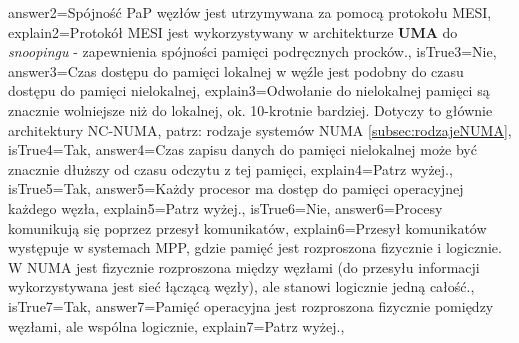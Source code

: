 \begin{enumerate}
\begin{minipage}{\textwidth}
{		answer2={Spójność PaP węzłów jest utrzymywana za pomocą protokołu MESI},%
		explain2={Protokół MESI jest wykorzystywany w architekturze \textbf{UMA} do \emph{snoopingu} - zapewnienia spójności pamięci podręcznych procków.},%
		isTrue3={Nie},%
		answer3={Czas dostępu do pamięci lokalnej w węźle jest podobny do czasu dostępu do pamięci nielokalnej},%
		explain3={Odwołanie do nielokalnej pamięci są znacznie wolniejsze niż do lokalnej, ok. 10-krotnie bardziej. Dotyczy to głównie architektury NC-NUMA, patrz: rodzaje systemów NUMA \ref{subsec:rodzajeNUMA}},%
		isTrue4={Tak},%
		answer4={Czas zapisu danych do pamięci nielokalnej może być znacznie dłuższy od czasu odczytu z tej pamięci},%
		explain4={Patrz wyżej.},%
		isTrue5={Tak},%
		answer5={Każdy procesor ma dostęp do pamięci operacyjnej każdego węzła}, %
		explain5={Patrz wyżej.}, %
		isTrue6={Nie}, %
		answer6={Procesy komunikują się poprzez przesył komunikatów}, %
		explain6={Przesył komunikatów występuje w systemach MPP, gdzie pamięć jest rozproszona fizycznie i logicznie. W NUMA jest fizycznie rozproszona między węzłami (do przesyłu informacji wykorzystywana jest sieć łączącą węzły), ale stanowi logicznie jedną całość.}, %
		isTrue7={Tak}, %
		answer7={Pamięć operacyjna jest rozproszona fizycznie pomiędzy węzłami, ale wspólna logicznie}, %
		explain7={Patrz wyżej.}, %
	}
\end{minipage}
\begin{minipage}{\textwidth}
\end{minipage}
\begin{minipage}{\textwidth}

\end{minipage}
\end{enumerate}

